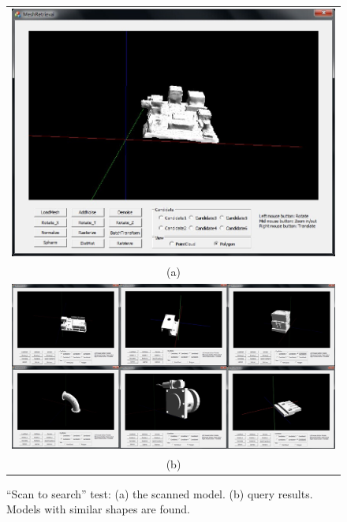 \begin{figure}
\begin{center}
\begin{tabular}{c}   %
   \includegraphics[height=0.4\columnwidth]{input_pi_scantosearch_test}\\
   (a)\\
   \includegraphics[width=0.95\linewidth]{output_pi_scantosearch_test}  \\
   (b)\\
\end{tabular}
\caption{``Scan to search'' test: (a) the scanned model. (b) query results.  Models with similar shapes are found. } 
  \label{scantosearchtest_pi_UI}
\end{center}
\end{figure}


